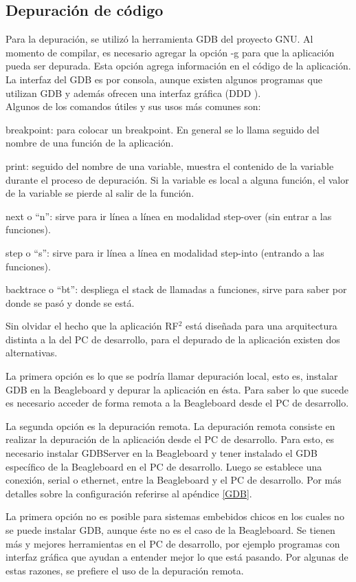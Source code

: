 \subsection{Depuración de código}
Para la depuración, se utilizó la herramienta GDB del proyecto GNU. 
Al momento de compilar, es necesario agregar la opción -g para que la aplicación pueda ser depurada. Esta opción agrega información en el código de la aplicación.
La interfaz del GDB es por consola, aunque existen algunos programas que utilizan GDB y además ofrecen una interfaz gráfica (DDD \cite{DDD}). \\
Algunos de los comandos útiles y sus usos más comunes son: 

\bigskip
breakpoint: para colocar un breakpoint. En general se lo llama seguido del nombre de una función de la aplicación.

print: seguido del nombre de una variable, muestra el contenido de la variable durante el proceso de depuración. Si la variable es local a alguna función, el valor de la variable se pierde al salir de la función.

next o “n”: sirve para ir línea a línea en modalidad step-over (sin entrar a las funciones).

step o “s”: sirve para ir línea a línea en modalidad step-into (entrando a las funciones).

backtrace o “bt”: despliega el stack de llamadas a funciones, sirve para saber por donde se pasó y donde se está.

\bigskip
Sin olvidar el hecho que la aplicación RF$^{2}$ está diseñada para una arquitectura distinta a la del PC de desarrollo, para el depurado de la aplicación existen dos alternativas. 

La primera opción es lo que se podría llamar depuración local, esto es, instalar GDB en la Beagleboard y depurar la aplicación en ésta. Para saber lo que sucede es necesario acceder de forma remota a la Beagleboard desde el PC de desarrollo. 

La segunda opción es la depuración remota. La depuración remota consiste en realizar la depuración de la aplicación desde el PC de desarrollo. Para esto, es necesario instalar GDBServer en la Beagleboard y tener instalado el GDB específico de la Beagleboard en el PC de desarrollo. Luego se establece una conexión, serial o ethernet, entre la Beagleboard y el PC de desarrollo. Por más detalles sobre la configuración referirse al apéndice \ref{GDB}.

\bigskip
La primera opción no es posible para sistemas embebidos chicos en los cuales no se puede instalar GDB, aunque éste no es el caso de la Beagleboard. 
Se tienen más y mejores herramientas en el PC de desarrollo, por ejemplo programas con interfaz gráfica que ayudan a entender mejor lo que está pasando. Por algunas de estas razones, se prefiere el uso de la depuración remota. 

